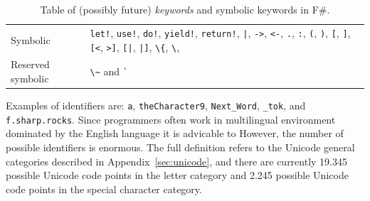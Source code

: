 \documentclass[fsharpNotes.tex]{subfiles}
\begin{document}
\begin{table}
\begin{tabularx}{\textwidth}{|l|>{\raggedright\arraybackslash}X|}
 Symbolic
 & \mbox{\lstinline{let!},} \mbox{\lstinline{use!},} \mbox{\lstinline{do!},} \mbox{\lstinline{yield!},} \mbox{\lstinline{return!},} \mbox{\lstinline{|},} \mbox{\lstinline{->},} \mbox{\lstinline{<-},} \mbox{\lstinline{.},} \mbox{\lstinline{:},} \mbox{\lstinline{(},} \mbox{\lstinline{)},} \mbox{\lstinline{[},} \mbox{\lstinline{]},} \mbox{\lstinline{[<},} \mbox{\lstinline{>]},} \mbox{\lstinline{[|},} \mbox{\lstinline{|]},} \mbox{\lstinline{\{},} \mbox{\lstinline{\}},} \mbox{\lstinline{'},} \mbox{\lstinline{#},} \mbox{\lstinline{:?>},} \mbox{\lstinline{:?},} \mbox{\lstinline{:>},} \mbox{\lstinline{..},} \mbox{\lstinline{::},} \mbox{\lstinline{:=},} \mbox{\lstinline{;;},} \mbox{\lstinline{;},} \mbox{\lstinline{=},} \mbox{\lstinline{_},} \mbox{\lstinline{?},} \mbox{\lstinline{??},} \mbox{\lstinline{(*)},} \mbox{\lstinline{<@},} \mbox{\lstinline{@>},} \mbox{\lstinline{<@@},} and \mbox{\lstinline{@@>}.} \\
 Reserved symbolic
 &\mbox{\lstinline{\~}} and \mbox{\lstinline{`}}\\
    \hline
  \end{tabularx}
  \caption{Table of (possibly future) \emph{keywords} and symbolic keywords in F\#.}
  \label{tab:keywords}
\end{table}
Examples of identifiers are: \lstinline{a}, \lstinline{theCharacter9}, \lstinline{Next_Word}, \lstinline{_tok}, and \lstinline{f.sharp.rocks}.  Since programmers often work in multilingual environment dominated by the English language it is advicable to   However, the number of possible identifiers is enormous. The full definition refers to the Unicode general categories described in Appendix~\ref{sec:unicode}, and there are currently 19.345 possible Unicode code points in the letter category and 2.245 possible Unicode code points in the special character category.
\end{document}
